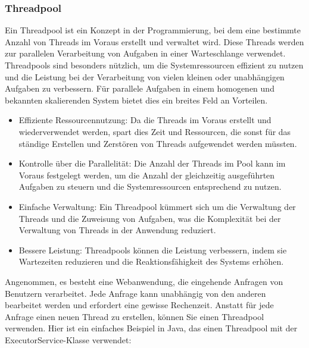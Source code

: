 \subsubsection{Threadpool}
Ein Threadpool ist ein Konzept in der Programmierung, bei dem eine bestimmte Anzahl von Threads im Voraus erstellt und verwaltet wird. Diese Threads werden zur parallelen Verarbeitung von Aufgaben in einer Warteschlange verwendet. Threadpools sind besonders nützlich, um die Systemressourcen effizient zu nutzen und die Leistung bei der Verarbeitung von vielen kleinen oder unabhängigen Aufgaben zu verbessern. Für parallele Aufgaben in einem homogenen und bekannten skalierenden System bietet dies ein breites Feld an Vorteilen. 
\begin{itemize}
\item Effiziente Ressourcennutzung: Da die Threads im Voraus erstellt und wiederverwendet werden, spart dies Zeit und Ressourcen, die sonst für das ständige Erstellen und Zerstören von Threads aufgewendet werden müssten.
\item Kontrolle über die Parallelität: Die Anzahl der Threads im Pool kann im Voraus festgelegt werden, um die Anzahl der gleichzeitig ausgeführten Aufgaben zu steuern und die Systemressourcen entsprechend zu nutzen.
\item Einfache Verwaltung: Ein Threadpool kümmert sich um die Verwaltung der Threads und die Zuweisung von Aufgaben, was die Komplexität bei der Verwaltung von Threads in der Anwendung reduziert.
\item Bessere Leistung: Threadpools können die Leistung verbessern, indem sie Wartezeiten reduzieren und die Reaktionsfähigkeit des Systems erhöhen.
\end{itemize}
Angenommen, es besteht eine Webanwendung, die eingehende Anfragen von Benutzern verarbeitet. Jede Anfrage kann unabhängig von den anderen bearbeitet werden und erfordert eine gewisse Rechenzeit. Anstatt für jede Anfrage einen neuen Thread zu erstellen, können Sie einen Threadpool verwenden. Hier ist ein einfaches Beispiel in Java, das einen Threadpool mit der ExecutorService-Klasse verwendet:\\\\

